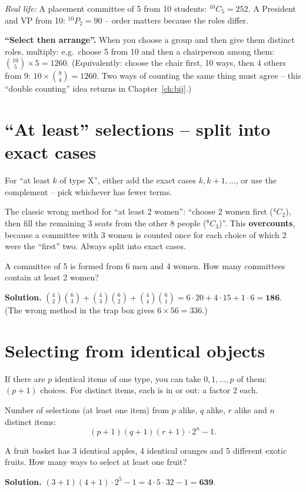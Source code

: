 \documentclass[11pt,a4paper,openany]{report}
\newcommand{\C}[2]{\binom{#1}{#2}}
\begin{document}
\textit{Real life:} A placement committee of 5 from 10 students: $^{10}C_5=252$. A President
and VP from 10: $^{10}P_2=90$ -- order matters because the roles differ.

\textbf{``Select then arrange''.} When you choose a group and then give them distinct roles, multiply:
e.g.\ choose 5 from 10 and then a chairperson among them: $\C{10}5\times5=1260$.
(Equivalently: choose the chair first, 10 ways, then 4 others from 9: $10\times\C94=1260$. Two ways of
counting the same thing must agree -- this ``double counting'' idea returns in Chapter~\ref{ch:bij}.)

\section{``At least'' selections -- split into exact cases}
For ``at least $k$ of type X'', either add the exact cases $k, k+1,\dots$, or use the complement
-- pick whichever has fewer terms.

\begin{trap}
The classic wrong method for ``at least 2 women'': ``choose 2 women first ($^4C_2$), then fill the
remaining 3 seats from the other 8 people ($^8C_3$)''. This \textbf{overcounts}, because a committee
with 3 women is counted once for each choice of which 2 were the ``first'' two. Always split into exact cases.
\end{trap}

\begin{example}
A committee of 5 is formed from 6 men and 4 women. How many committees contain at least 2 women?

\textbf{Solution.}
$\C42\C63+\C43\C62+\C44\C61=6\cdot20+4\cdot15+1\cdot6=\mathbf{186}$.
(The wrong method in the trap box gives $6\times56=336$.)
\end{example}

\section{Selecting from identical objects}
If there are $p$ identical items of one type, you can take $0,1,\dots,p$ of them: $(p+1)$ choices.
For distinct items, each is in or out: a factor 2 each.

Number of selections (at least one item) from $p$ alike, $q$ alike, $r$ alike and $n$ distinct items:
\[(p+1)(q+1)(r+1)\cdot 2^n-1.\]

\begin{example}
A fruit basket has 3 identical apples, 4 identical oranges and 5 different exotic fruits.
How many ways to select at least one fruit?

\textbf{Solution.} $(3+1)(4+1)\cdot2^5-1=4\cdot5\cdot32-1=\mathbf{639}$.
\end{example}
\end{document}
